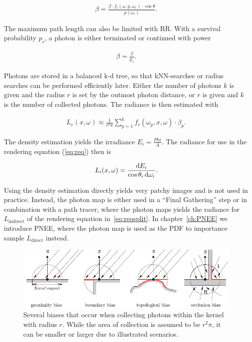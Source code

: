 \begin{align}
\beta = \frac{\beta \cdot f_r(\omega, y, \omega_r) \cdot \cos\theta}{p(\omega_r)}.
\end{align}

The maximum path length can also be limited with RR. With a survival probability $p_s$, a photon is either terminated or continued with power

\begin{align}
\beta = \frac{\beta}{p_s}.
\end{align}

Photons are stored in a balanced k-d tree, so that kNN-searches or radius searches can be performed efficiently later. Either the number of photons $k$ is given and the radius $r$ is set by the outmost photon distance, or $r$ is given and $k$ is the number of collected photons. The radiance is then estimated with

\begin{align}
L_r(x, \omega) \approx \frac{1}{r^2\pi} \sum_{p=1}^k f_r(\omega_p, x, \omega) \cdot \beta_p.
\end{align}

The density estimation yields the irradiance $E_i = \frac{Phi}{A}$. The radiance for use in the rendering equation (\ref{eq:req}) then is

\begin{align}
L_i(x, \omega) = \frac{\mathop{}\!\mathrm{d} E_i}{\cos\theta_i\mathop{}\!\mathrm{d}\omega_i}.
\end{align}

Using the density estimation directly yields very patchy images and is not used in practice. Instead, the photon map is either used in a \enquote{Final Gathering} step or in combination with a path tracer, where the photon maps yields the radiance for $L_\text{indirect}$ of the rendering equation in~\ref{eq:reqsplit}. In chapter~\ref{ch:PNEE} we introduce PNEE, where the photon map is used as the PDF to importance sample $L_\text{direct}$ instead.

\begin{figure}
    \centering
    \includegraphics[width=1\textwidth]{figures/biases.pdf}
    \caption{Several biases that occur when collecting photons within the kernel with radius $r$. While the area of collection is assumed to be $r^2\pi$, it can be smaller or larger due to illustrated scenarios.\protect\footnotemark}
    \label{fig:biases}
\end{figure}

